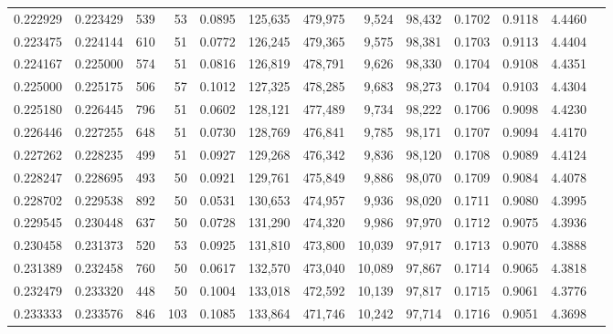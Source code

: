\begin{tabular}{rrrrrrrrrrrrr}
0.222929 & 0.223429 &    539 &    53 &                                     0.0895 & 125,635 & 479,975 &   9,524 &  98,432 & 0.1702 & 0.9118 & 4.4460 \\
0.223475 & 0.224144 &    610 &    51 &                                     0.0772 & 126,245 & 479,365 &   9,575 &  98,381 & 0.1703 & 0.9113 & 4.4404 \\
0.224167 & 0.225000 &    574 &    51 &                                     0.0816 & 126,819 & 478,791 &   9,626 &  98,330 & 0.1704 & 0.9108 & 4.4351 \\
0.225000 & 0.225175 &    506 &    57 &                                     0.1012 & 127,325 & 478,285 &   9,683 &  98,273 & 0.1704 & 0.9103 & 4.4304 \\
0.225180 & 0.226445 &    796 &    51 &                                     0.0602 & 128,121 & 477,489 &   9,734 &  98,222 & 0.1706 & 0.9098 & 4.4230 \\
0.226446 & 0.227255 &    648 &    51 &                                     0.0730 & 128,769 & 476,841 &   9,785 &  98,171 & 0.1707 & 0.9094 & 4.4170 \\
0.227262 & 0.228235 &    499 &    51 &                                     0.0927 & 129,268 & 476,342 &   9,836 &  98,120 & 0.1708 & 0.9089 & 4.4124 \\
0.228247 & 0.228695 &    493 &    50 &                                     0.0921 & 129,761 & 475,849 &   9,886 &  98,070 & 0.1709 & 0.9084 & 4.4078 \\
0.228702 & 0.229538 &    892 &    50 &                                     0.0531 & 130,653 & 474,957 &   9,936 &  98,020 & 0.1711 & 0.9080 & 4.3995 \\
0.229545 & 0.230448 &    637 &    50 &                                     0.0728 & 131,290 & 474,320 &   9,986 &  97,970 & 0.1712 & 0.9075 & 4.3936 \\
0.230458 & 0.231373 &    520 &    53 &                                     0.0925 & 131,810 & 473,800 &  10,039 &  97,917 & 0.1713 & 0.9070 & 4.3888 \\
0.231389 & 0.232458 &    760 &    50 &                                     0.0617 & 132,570 & 473,040 &  10,089 &  97,867 & 0.1714 & 0.9065 & 4.3818 \\
0.232479 & 0.233320 &    448 &    50 &                                     0.1004 & 133,018 & 472,592 &  10,139 &  97,817 & 0.1715 & 0.9061 & 4.3776 \\
0.233333 & 0.233576 &    846 &   103 &                                     0.1085 & 133,864 & 471,746 &  10,242 &  97,714 & 0.1716 & 0.9051 & 4.3698 \\

\end{tabular}
